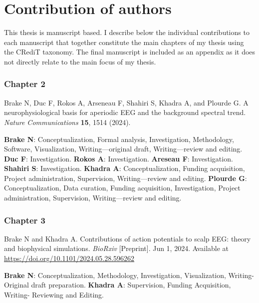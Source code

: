 \chapter*{Contribution of authors}

\setlength{\parindent}{0pt}
\setlength{\parskip}{3pt}

This thesis is manuscript based. I describe below the individual contributions to each manuscript that together constitute the main chapters of my thesis using the CRediT taxonomy. The final manuscript is included as an appendix as it does not directly relate to the main focus of my thesis.

\vspace{-.5em}
\subsection*{Chapter 2}

Brake N, Duc F, Rokos A, Arseneau F, Shahiri S, Khadra A, and Plourde G. A neurophysiological basis for aperiodic EEG and the background spectral trend. \textit{Nature Communications} \textbf{15}, 1514 (2024).

{\small \textbf{Brake N}: Conceptualization, Formal analysis, Investigation, Methodology, Software, Visualization, Writing—original draft, Writing—review and editing. \textbf{Duc F}: Investigation. \textbf{Rokos A}: Investigation. \textbf{Areseau F}: Investigation. \textbf{Shahiri S}: Investigation. \textbf{Khadra A}: Conceptualization, Funding acquisition, Project administration, Supervision, Writing—review and editing. \textbf{Plourde G}: Conceptualization, Data curation, Funding acquisition, Investigation, Project administration, Supervision, Writing—review and editing.}

\vspace{-.5em}
\subsection*{Chapter 3}
Brake N and Khadra A. Contributions of action potentials to scalp EEG: theory and biophysical simulations. \textit{BioRxiv} [Preprint]. Jun 1, 2024. Available at \url{https://doi.org/10.1101/2024.05.28.596262}

{\small \textbf{Brake N}: Conceptualization, Methodology, Investigation,  Visualization, Writing- Original draft preparation. \textbf{Khadra A}: Supervision, Funding Acquisition, Writing- Reviewing and Editing.}

